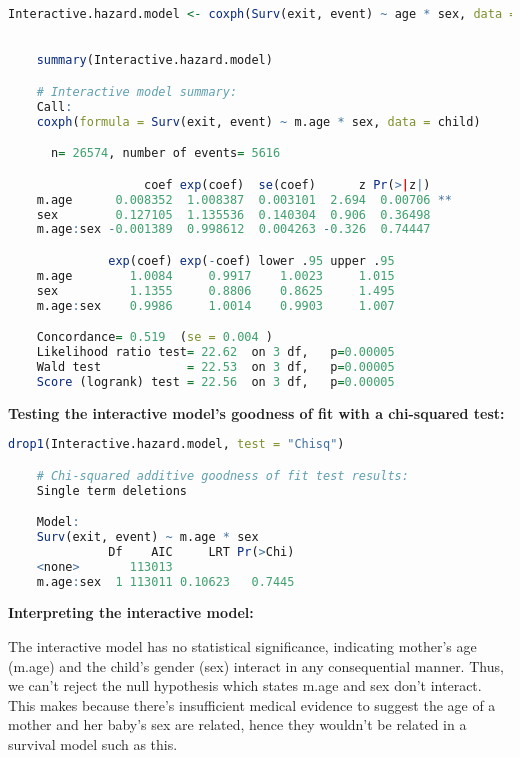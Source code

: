 \documentclass[12pt,letterpaper]{article}
\begin{document}
    \begin{lstlisting}[language = R]
    Interactive.hazard.model <- coxph(Surv(exit, event) ~ age * sex, data = infants)

    
    summary(Interactive.hazard.model)

    # Interactive model summary:
    Call:
    coxph(formula = Surv(exit, event) ~ m.age * sex, data = child)

      n= 26574, number of events= 5616 

                   coef exp(coef)  se(coef)      z Pr(>|z|)   
    m.age      0.008352  1.008387  0.003101  2.694  0.00706 **
    sex        0.127105  1.135536  0.140304  0.906  0.36498   
    m.age:sex -0.001389  0.998612  0.004263 -0.326  0.74447   

              exp(coef) exp(-coef) lower .95 upper .95
    m.age        1.0084     0.9917    1.0023     1.015
    sex          1.1355     0.8806    0.8625     1.495
    m.age:sex    0.9986     1.0014    0.9903     1.007

    Concordance= 0.519  (se = 0.004 )
    Likelihood ratio test= 22.62  on 3 df,   p=0.00005
    Wald test            = 22.53  on 3 df,   p=0.00005
    Score (logrank) test = 22.56  on 3 df,   p=0.00005\end{lstlisting}

\vspace{.45cm}

\textbf{Testing the interactive model's goodness of fit with a chi-squared test:}

\vspace{.2cm} 

    \begin{lstlisting}[language = R]
    drop1(Interactive.hazard.model, test = "Chisq")

    # Chi-squared additive goodness of fit test results:
    Single term deletions

    Model:
    Surv(exit, event) ~ m.age * sex
              Df    AIC     LRT Pr(>Chi)
    <none>       113013                 
    m.age:sex  1 113011 0.10623   0.7445\end{lstlisting}

\vspace{.45cm}

\textbf{Interpreting the interactive model:}

\vspace{.2cm} 

    \noindent The interactive model has no statistical significance, indicating mother's age (m.age) and the child's gender (sex) interact in any consequential manner. Thus, we can't reject the null hypothesis which states m.age and sex don't interact. This makes because there's insufficient medical evidence to suggest the age of a mother and her baby's sex are related, hence they wouldn't be related in a survival model such as this.
\end{document}
